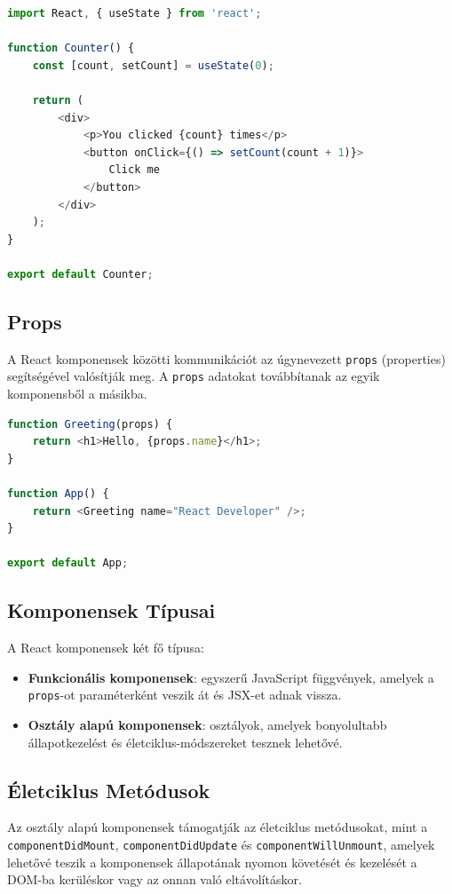 \documentclass[colorlinks]{thesis-kando}
\theoremstyle{definition}
\theoremstyle{remark}
\begin{document}
\begin{lstlisting}[language=JavaScript]
import React, { useState } from 'react';

function Counter() {
    const [count, setCount] = useState(0);

    return (
        <div>
            <p>You clicked {count} times</p>
            <button onClick={() => setCount(count + 1)}>
                Click me
            </button>
        </div>
    );
}

export default Counter;
\end{lstlisting}

\subsection{Props}
A React komponensek közötti kommunikációt az úgynevezett \texttt{props} (properties) segítségével valósítják meg. A \texttt{props} adatokat továbbítanak az egyik komponensből a másikba.

\begin{lstlisting}[language = JavaScript]
function Greeting(props) {
    return <h1>Hello, {props.name}</h1>;
}

function App() {
    return <Greeting name="React Developer" />;
}

export default App;
\end{lstlisting}

\subsection{Komponensek Típusai}
A React komponensek két fő típusa:
\begin{itemize}
    \item \textbf{Funkcionális komponensek}: egyszerű JavaScript függvények, amelyek a \texttt{props}-ot paraméterként veszik át és JSX-et adnak vissza.
    \item \textbf{Osztály alapú komponensek}: osztályok, amelyek bonyolultabb állapotkezelést és életciklus-módszereket tesznek lehetővé.
\end{itemize}

\pagebreak

\subsection{Életciklus Metódusok}
Az osztály alapú komponensek támogatják az életciklus metódusokat, mint a \texttt{componentDidMount}, \texttt{componentDidUpdate} és \texttt{componentWillUnmount}, amelyek lehetővé teszik a komponensek állapotának nyomon követését és kezelését a DOM-ba kerüléskor vagy az onnan való eltávolításkor.
\end{document}
